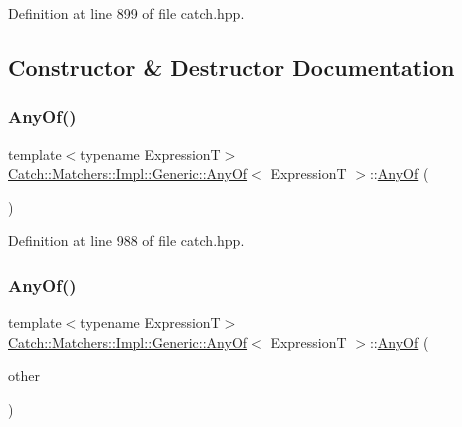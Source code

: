 Definition at line 899 of file catch.\+hpp.



\subsection{Constructor \& Destructor Documentation}
\hypertarget{class_catch_1_1_matchers_1_1_impl_1_1_generic_1_1_any_of_a131d84740c6b250ff7ef2213ae0de2aa}{}\label{class_catch_1_1_matchers_1_1_impl_1_1_generic_1_1_any_of_a131d84740c6b250ff7ef2213ae0de2aa} 
\subsubsection{\texorpdfstring{Any\+Of()}{AnyOf()}\hspace{0.1cm}{\footnotesize\ttfamily [1/2]}}
{\footnotesize\ttfamily template$<$typename ExpressionT$>$ \\
\hyperlink{class_catch_1_1_matchers_1_1_impl_1_1_generic_1_1_any_of}{Catch\+::\+Matchers\+::\+Impl\+::\+Generic\+::\+Any\+Of}$<$ ExpressionT $>$\+::\hyperlink{class_catch_1_1_matchers_1_1_impl_1_1_generic_1_1_any_of}{Any\+Of} (\begin{DoxyParamCaption}{ }\end{DoxyParamCaption})\hspace{0.3cm}{\ttfamily [inline]}}



Definition at line 988 of file catch.\+hpp.

\hypertarget{class_catch_1_1_matchers_1_1_impl_1_1_generic_1_1_any_of_a74fbc05b32d334fcbfd0fae0163a404e}{}\label{class_catch_1_1_matchers_1_1_impl_1_1_generic_1_1_any_of_a74fbc05b32d334fcbfd0fae0163a404e} 
\subsubsection{\texorpdfstring{Any\+Of()}{AnyOf()}\hspace{0.1cm}{\footnotesize\ttfamily [2/2]}}
{\footnotesize\ttfamily template$<$typename ExpressionT$>$ \\
\hyperlink{class_catch_1_1_matchers_1_1_impl_1_1_generic_1_1_any_of}{Catch\+::\+Matchers\+::\+Impl\+::\+Generic\+::\+Any\+Of}$<$ ExpressionT $>$\+::\hyperlink{class_catch_1_1_matchers_1_1_impl_1_1_generic_1_1_any_of}{Any\+Of} (\begin{DoxyParamCaption}\item[{\hyperlink{class_catch_1_1_matchers_1_1_impl_1_1_generic_1_1_any_of}{Any\+Of}$<$ ExpressionT $>$ const \&}]{other }\end{DoxyParamCaption})\hspace{0.3cm}{\ttfamily [inline]}}



